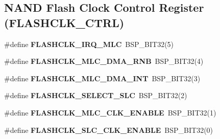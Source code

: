 \subsection*{N\+A\+ND Flash Clock Control Register (F\+L\+A\+S\+H\+C\+L\+K\+\_\+\+C\+T\+RL)}
\begin{DoxyCompactItemize}
\item 
\mbox{\label{group__lpc32xx__nand__mlc_ga99951f3d82cce502b0d9f6bc3c191bdf}} 
\#define {\bfseries F\+L\+A\+S\+H\+C\+L\+K\+\_\+\+I\+R\+Q\+\_\+\+M\+LC}~B\+S\+P\+\_\+\+B\+I\+T32(5)
\item 
\mbox{\label{group__lpc32xx__nand__mlc_ga1411860bd0bfea5215301204efe1c7a6}} 
\#define {\bfseries F\+L\+A\+S\+H\+C\+L\+K\+\_\+\+M\+L\+C\+\_\+\+D\+M\+A\+\_\+\+R\+NB}~B\+S\+P\+\_\+\+B\+I\+T32(4)
\item 
\mbox{\label{group__lpc32xx__nand__mlc_ga5ea8785193a586ea3a67721ab4467b3c}} 
\#define {\bfseries F\+L\+A\+S\+H\+C\+L\+K\+\_\+\+M\+L\+C\+\_\+\+D\+M\+A\+\_\+\+I\+NT}~B\+S\+P\+\_\+\+B\+I\+T32(3)
\item 
\mbox{\label{group__lpc32xx__nand__mlc_gabd5e3f6483ceb7a275a5880cddabdc60}} 
\#define {\bfseries F\+L\+A\+S\+H\+C\+L\+K\+\_\+\+S\+E\+L\+E\+C\+T\+\_\+\+S\+LC}~B\+S\+P\+\_\+\+B\+I\+T32(2)
\item 
\mbox{\label{group__lpc32xx__nand__mlc_ga5c7f28f246edb641eff9ab2f488c32cf}} 
\#define {\bfseries F\+L\+A\+S\+H\+C\+L\+K\+\_\+\+M\+L\+C\+\_\+\+C\+L\+K\+\_\+\+E\+N\+A\+B\+LE}~B\+S\+P\+\_\+\+B\+I\+T32(1)
\item 
\mbox{\label{group__lpc32xx__nand__mlc_gaa3b7f9ebf43e1a55b6af9c71efe3409b}} 
\#define {\bfseries F\+L\+A\+S\+H\+C\+L\+K\+\_\+\+S\+L\+C\+\_\+\+C\+L\+K\+\_\+\+E\+N\+A\+B\+LE}~B\+S\+P\+\_\+\+B\+I\+T32(0)
\end{DoxyCompactItemize}
